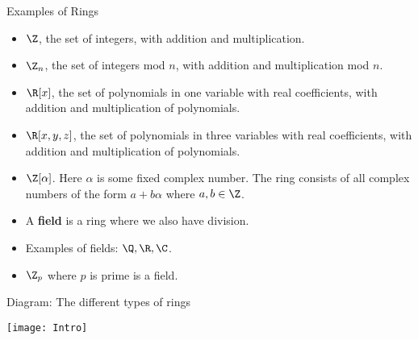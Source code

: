 \documentclass[handout]{beamer}
\begin{document}

\begin{frame}{Examples of Rings}

\begin{itemize}
  \item $\Z$, the set of integers, with addition and multiplication.
  \item $\Z_n$, the set of integers mod $n$, with addition and multiplication mod $n$.
  \item $\R[x]$, the set of polynomials in one variable with real coefficients, with addition and multiplication of polynomials.
  \item $\R[x,y,z]$, the set of polynomials in three variables with real coefficients, with addition and multiplication of polynomials.
  \item $\Z[\alpha]$. Here $\alpha$ is some fixed complex number. The ring consists of all complex numbers of the form $a+b\alpha$ where
  $a,b\in\Z$.
  \item A \textbf{field} is a ring where we also have division.
  \item Examples of fields: $\Q, \R, \C$.
  \item $\Z_p$ where $p$ is prime is a field.
\end{itemize}

\end{frame}


\begin{frame}{Diagram: The different types of rings}

\begin{center}
\texttt{[image: Intro]}
\end{center}

\end{frame}



\end{document}
